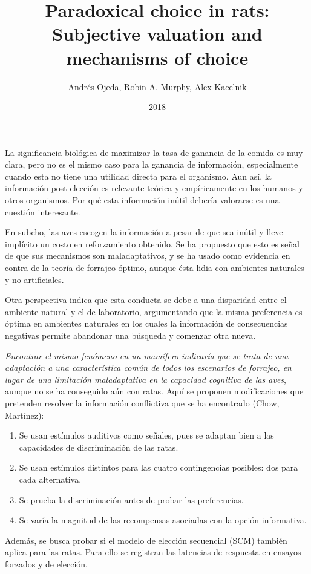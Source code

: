 \documentclass[a4paper,12pt]{article}
\title{Paradoxical choice in rats: Subjective valuation and mechanisms of choice}
\author{Andrés Ojeda, Robin A. Murphy, Alex Kacelnik}
\date{2018}
\begin{document}
{\scshape\bfseries \maketitle}

La significancia biológica de maximizar la tasa de ganancia de la comida es muy clara, pero no es el mismo caso para la ganancia de información, especialmente cuando esta no tiene una utilidad directa para el organismo. Aun así, la información post-elección es relevante teórica y empíricamente en los humanos y otros organismos. Por qué esta información inútil debería valorarse es una cuestión interesante.

En subcho, las aves escogen la información a pesar de que sea inútil y lleve implícito un costo en reforzamiento obtenido. Se ha propuesto que esto es señal de que sus mecanismos son maladaptativos, y se ha usado como evidencia en contra de la teoría de forrajeo óptimo, aunque ésta lidia con ambientes naturales y no artificiales.

Otra perspectiva indica que esta conducta se debe a una disparidad entre el ambiente natural y el de laboratorio, argumentando que la misma preferencia es óptima en ambientes naturales en los cuales la información de consecuencias negativas permite abandonar una búsqueda y comenzar otra nueva.

{\itshape Encontrar el mismo fenómeno en un mamífero indicaría que se trata de una adaptación a una característica común de todos los escenarios de forrajeo, en lugar de una limitación maladaptativa en la capacidad cognitiva de las aves}, aunque no se ha conseguido aún con ratas. Aquí se proponen modificaciones que pretenden resolver la información conflictiva que se ha encontrado (Chow, Martínez): 
\begin{enumerate}
	\item Se usan estímulos auditivos como señales, pues se adaptan bien a las capacidades de discriminación de las ratas.
	\item Se usan estímulos distintos para las cuatro contingencias posibles: dos para cada alternativa.
	\item Se prueba la discriminación antes de probar las preferencias.
	\item Se varía la magnitud de las recompensas asociadas con la opción informativa.
\end{enumerate}

Además, se busca probar si el modelo de elección secuencial (SCM) también aplica para las ratas. Para ello se registran las latencias de respuesta en ensayos forzados y de elección.
\end{document}
